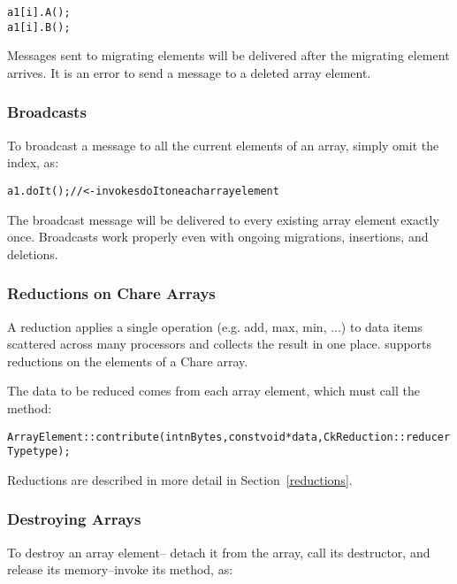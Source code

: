 \begin{alltt}
a1[i].A();
a1[i].B();
\end{alltt}

Messages sent to migrating elements will be delivered after
the migrating element arrives.  It is an error to send 
a message to a deleted array element.


\subsubsection{Broadcasts}

To  broadcast a message to all the current elements of an array, 
simply omit the index, as:

\begin{alltt}
a1.doIt(); //<- invokes doIt on each array element
\end{alltt}

The broadcast message will be delivered to every existing array 
element exactly once.  Broadcasts work properly even with ongoing
migrations, insertions, and deletions.


\subsubsection{Reductions on Chare Arrays}

A reduction applies a single operation (e.g. add,
max, min, ...) to data items scattered across many processors and
collects the result in one place.  \charmpp{} supports reductions on the
elements of a Chare array.

The data to be reduced comes from each array element, 
which must call the  method:

\begin{alltt}
ArrayElement::contribute(int nBytes,const void *data,CkReduction::reducerType type);
\end{alltt}

Reductions are described in more detail in Section~\ref{reductions}.


\subsubsection{Destroying Arrays}

To destroy an array element-- detach it from the array,
call its destructor, and release its memory--invoke its 
 method, as:

